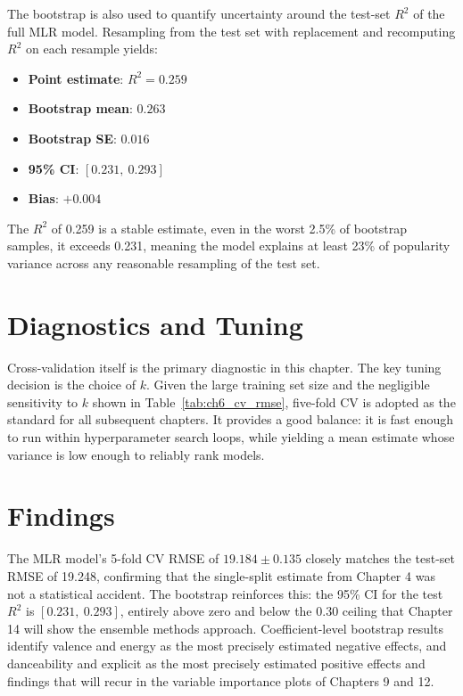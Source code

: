 \documentclass[12pt, oneside]{book}
\begin{document}
The bootstrap is also used to quantify uncertainty around the test-set $R^2$ of the full MLR model. Resampling from the test set with replacement and recomputing $R^2$ on each resample yields:
 
\begin{itemize}
    \item \textbf{Point estimate}: $R^2 = 0.259$
    \item \textbf{Bootstrap mean}: $0.263$
    \item \textbf{Bootstrap SE}: $0.016$
    \item \textbf{95\% CI}: $[0.231,\ 0.293]$
    \item \textbf{Bias}: $+0.004$
\end{itemize}
 
The $R^2$ of 0.259 is a stable estimate, even in the worst 2.5\% of bootstrap samples, it exceeds 0.231, meaning the model explains at least 23\% of popularity variance across any reasonable resampling of the test set.
 
\section{Diagnostics and Tuning}
 
Cross-validation itself is the primary diagnostic in this chapter. The key tuning decision is the choice of $k$. Given the large training set size and the negligible sensitivity to $k$ shown in Table~\ref{tab:ch6_cv_rmse}, five-fold CV is adopted as the standard for all subsequent chapters. It provides a good balance: it is fast enough to run within hyperparameter search loops, while yielding a mean estimate whose variance is low enough to reliably rank models.
 
\section{Findings}
 
The MLR model's 5-fold CV RMSE of $19.184 \pm 0.135$ closely matches the test-set RMSE of 19.248, confirming that the single-split estimate from Chapter 4 was not a statistical accident. The bootstrap reinforces this: the 95\% CI for the test $R^2$ is $[0.231,\ 0.293]$, entirely above zero and below the 0.30 ceiling that Chapter 14 will show the ensemble methods approach. Coefficient-level bootstrap results identify valence and energy as the most precisely estimated negative effects, and danceability and explicit as the most precisely estimated positive effects and findings that will recur in the variable importance plots of Chapters 9 and 12.
 
\end{document}
